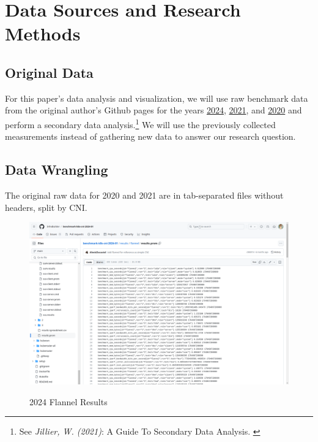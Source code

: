 %
%

\pagebreak
\section{Data Sources and Research Methods}

\onehalfspacing

\subsection{Original Data}

For this paper's data analysis and visualization, we will use raw benchmark data from the original author's Github pages for the years \href{https://github.com/InfraBuilder/benchmark-k8s-cni-2024-01}{2024}, \href{https://github.com/InfraBuilder/benchmark-k8s-cni-2021-05}{2021}, and \href{https://github.com/InfraBuilder/benchmark-k8s-cni-2020-08}{2020} and perform a secondary data analysis.\footnote{See \textit{Jillier, W. (2021)}: A Guide To Secondary Data Analysis. \cite{secondaryDA}} We will use the previously collected measurements instead of gathering new data to answer our research question.

\subsection{Data Wrangling}

The original raw data for 2020 and 2021 are in tab-separated files without headers, split by CNI.

\begin{figure}[H]
\centering
\caption {2024 Flannel Results}
\includegraphics[width=\linewidth]{images/flannel-prom.png}
\label{fig:flannel-prom}
\end{figure}

